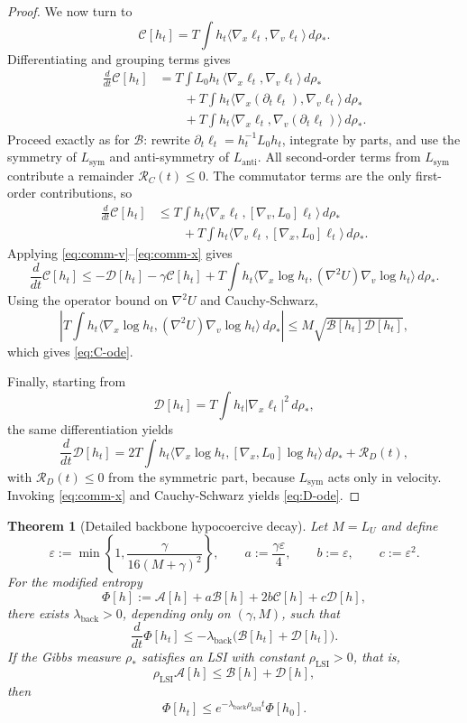 \documentclass[11pt]{article}
\newtheorem{theorem}{Theorem}[section]
\theoremstyle{definition}
\theoremstyle{remark}
\begin{document}
\begin{proof}
We now turn to
\[
\mathcal C[h_t]=T\int h_t\langle \nabla_x\ell_t,\nabla_v\ell_t\rangle\,d\rho_*.
\]
Differentiating and grouping terms gives
\begin{align*}
\frac{d}{dt}\mathcal C[h_t]
&=
T\int L_0 h_t \,\langle \nabla_x\ell_t,\nabla_v\ell_t\rangle\,d\rho_*\\
&\qquad
+T\int h_t\langle \nabla_x(\partial_t \ell_t),\nabla_v\ell_t\rangle\,d\rho_*\\
&\qquad
+T\int h_t\langle \nabla_x\ell_t,\nabla_v(\partial_t \ell_t)\rangle\,d\rho_*.
\end{align*}
Proceed exactly as for $\mathcal B$: rewrite
$\partial_t\ell_t=h_t^{-1}L_0 h_t$, integrate by parts, and use the symmetry of
$L_{\mathrm{sym}}$ and anti-symmetry of $L_{\mathrm{anti}}$. All second-order
terms from $L_{\mathrm{sym}}$ contribute a remainder $\mathcal R_C(t)\leq0$.
The commutator terms are the only first-order contributions, so
\begin{align*}
\frac{d}{dt}\mathcal C[h_t]
&\leq
T\int h_t\langle \nabla_x\ell_t,[\nabla_v,L_0]\ell_t\rangle\,d\rho_*\\
&\qquad
+T\int h_t\langle \nabla_v\ell_t,[\nabla_x,L_0]\ell_t\rangle\,d\rho_*.
\end{align*}
Applying \eqref{eq:comm-v}--\eqref{eq:comm-x} gives
\[
\frac{d}{dt}\mathcal C[h_t]
\leq
-\mathcal D[h_t]-\gamma \mathcal C[h_t]
+T\int h_t\langle \nabla_x\log h_t,(\nabla^2U)\nabla_v\log h_t\rangle\,d\rho_*.
\]
Using the operator bound on $\nabla^2 U$ and Cauchy-Schwarz,
\[
\left|
T\int h_t\langle \nabla_x\log h_t,(\nabla^2U)\nabla_v\log h_t\rangle\,d\rho_*
\right|
\leq
M\sqrt{\mathcal B[h_t]\mathcal D[h_t]},
\]
which gives \eqref{eq:C-ode}.

Finally, starting from
\[
\mathcal D[h_t]=T\int h_t |\nabla_x\ell_t|^2\,d\rho_*,
\]
the same differentiation yields
\[
\frac{d}{dt}\mathcal D[h_t]
=
2T\int h_t\langle \nabla_x\log h_t,[\nabla_x,L_0]\log h_t\rangle\,d\rho_*
+\mathcal R_D(t),
\]
with $\mathcal R_D(t)\leq0$ from the symmetric part, because $L_{\mathrm{sym}}$
acts only in velocity. Invoking \eqref{eq:comm-x} and Cauchy-Schwarz yields
\eqref{eq:D-ode}.
\end{proof}

\begin{theorem}[Detailed backbone hypocoercive decay]\label{thm:backbone-detailed}
Let $M=L_U$ and define
\[
\varepsilon:=\min\left\{1,\frac{\gamma}{16(M+\gamma)^2}\right\},
\qquad
a:=\frac{\gamma\varepsilon}{4},
\qquad
b:=\varepsilon,
\qquad
c:=\varepsilon^2.
\]
For the modified entropy
\begin{equation}\label{eq:Phi}
\Phi[h]
:=
\mathcal A[h]+a\mathcal B[h]+2b\mathcal C[h]+c\mathcal D[h],
\end{equation}
there exists $\lambda_{\mathrm{back}}>0$, depending only on
$(\gamma,M)$, such that
\[
\frac{d}{dt}\Phi[h_t]
\leq
-\lambda_{\mathrm{back}}\bigl(\mathcal B[h_t]+\mathcal D[h_t]\bigr).
\]
If the Gibbs measure $\rho_*$ satisfies an LSI with constant $\rho_{\mathrm{LSI}}>0$,
that is,
\[
\rho_{\mathrm{LSI}}\mathcal A[h]\leq \mathcal B[h]+\mathcal D[h],
\]
then
\[
\Phi[h_t]\leq e^{-\lambda_{\mathrm{back}}\rho_{\mathrm{LSI}}t}\Phi[h_0].
\]
\end{theorem}
\end{document}
